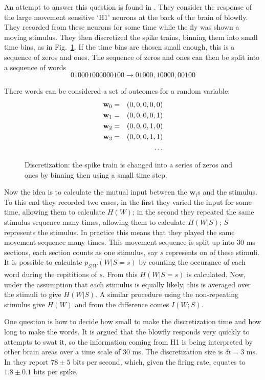 \documentclass[12pt]{article}
\begin{document}
An attempt to answer this question is found in
\cite{StrongEtAl1998}. They consider the response of the large
movement sensitive \lq{}H1\rq{} neurons at the back of the brain of
blowfly. They recorded from these neurons for some time while the fly
was shown a moving stimulus. They then discretized the spike trains,
binning them into small time bins, as in
Fig.~\ref{fig_discretization}. If the time bins are chosen small
enough, this is a sequence of zeros and ones. The sequence of zeros
and ones can then be split into a sequence of words
\begin{equation}
010001000000100\rightarrow 01000,10000,00100
\end{equation}

\newpage
There words can be considered a set of outcomes for a random variable:
\begin{eqnarray}
\textbf{w}_0&=&(0,0,0,0,0)\cr
\textbf{w}_1&=&(0,0,0,0,1)\cr
\textbf{w}_2&=&(0,0,0,1,0)\cr
\textbf{w}_3&=&(0,0,0,1,1)\cr
&&\ldots
\end{eqnarray}

\begin{figure}[htb]
\begin{center}

\end{center}
\caption{Discretization: the spike train is changed into a series of
  zeros and ones by binning then using a small time
  step.\label{fig_discretization}}
\end{figure}

Now the idea is to calculate the mutual input between the
$\textbf{w}_i$s and the stimulus. To this end they recorded two cases,
in the first they varied the input for some time, allowing them to
calculate $H(W)$; in the second they repeated the same stimulus
sequence many times, allowing them to calculate $H(W|S)$; $S$
represents the stimulus. In practice this means that they played the
same movement sequence many times. This movement sequence is split up
into 30 ms sections, each section counts as one stimulus, say $s$
represents on of these stimuli. It is possible to calculate
$p_{S|W}(W|S=s)$ by counting the occurance of each word during the
repititions of $s$. From this $H(W|S=s)$ is calculated. Now, under the
assumption that each stimulus is equally likely, this is averaged over
the stimuli to give $H(W|S)$. A similar procedure using the
non-repeating stimulus give $H(W)$ and from the difference comes
$I(W;S)$.

One question is how to decide how small to make the discretization
time and how long to make the words. It is argued that the blowfly
responds very quickly to attempts to swat it, so the information
coming from H1 is being interpreted by other brain areas over a time
scale of 30 ms. The discretization size is $\delta t=3$ ms. In
\cite{StrongEtAl1998} they report $78\pm 5$ bits per second, which,
given the firing rate, equates to $1.8\pm 0.1$ bits per spike.
\end{document}
